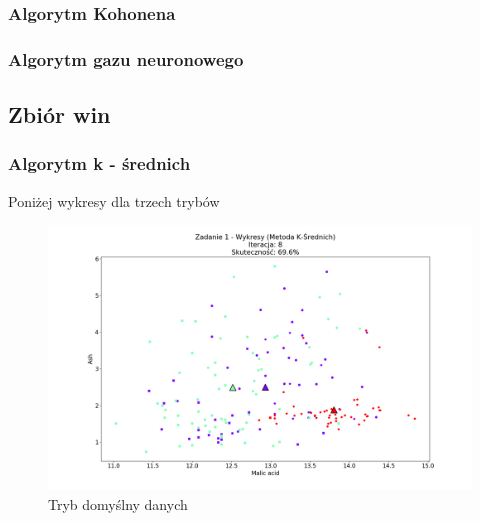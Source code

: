 \documentclass{classrep}
\begin{document}
{{		\subsubsection{Algorytm Kohonena}
		{ 

		}

		\subsubsection{Algorytm gazu neuronowego}
		{

		}
	}
	\subsection{Zbiór win}
	{
		\subsubsection{Algorytm k - średnich}
		{
			Poniżej wykresy dla trzech trybów
				\begin{figure}[!htbp]
					\centering
					\includegraphics[width=\textwidth,width=95mm]{wykresy/plot_k_meansWineDefault.png}
					\caption{Tryb domyślny danych}
				\end{figure}
			
}}}
\end{document}
